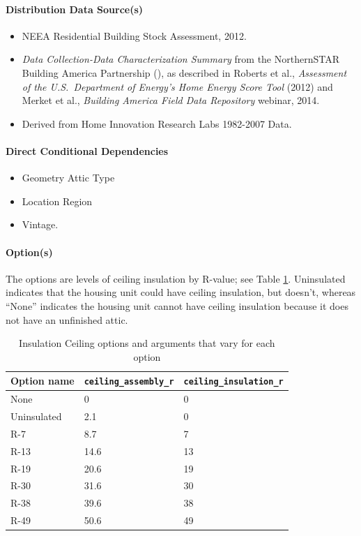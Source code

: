\paragraph{Distribution Data Source(s)}
\begin{itemize}
 
\item
  NEEA Residential Building Stock Assessment, 2012.
\item
  \textit{Data Collection-Data Characterization Summary} from the NorthernSTAR Building America Partnership (\cite{Nettleton2012}), as described in
  Roberts et al., \textit{Assessment of the U.S.~Department of
  Energy's Home Energy Score Tool} (2012)
  and Merket et al., \textit{Building America Field Data
  Repository} webinar, 2014.
\item
  Derived from Home Innovation Research Labs 1982-2007 Data.
\end{itemize}
\paragraph{Direct Conditional Dependencies}

\begin{itemize}
    \item Geometry Attic Type
    \item Location Region
    \item Vintage.
\end{itemize}
\paragraph{Option(s)}
The options are levels of ceiling insulation by R-value; see Table \ref{table:hc_opt_ins_ceil}. Uninsulated indicates that the housing unit could have ceiling insulation, but doesn't, whereas ``None'' indicates the housing unit cannot have ceiling insulation because it does not have an unfinished attic. 

\begin{longtable}[]{|p{3.5cm}|p{3.3cm}|p{3.3cm}|} \caption{Insulation Ceiling options and arguments that vary for each option} \label{table:hc_opt_ins_ceil} \\  
\toprule\noalign{}
Option name & \texttt{ceiling\_assembly\_r} &
\texttt{ceiling\_insulation\_r} \\
\midrule\noalign{}
\endhead
\bottomrule\noalign{}
\endlastfoot
None & 0 & 0 \\
Uninsulated & 2.1 & 0 \\
R-7 & 8.7 & 7 \\
R-13 & 14.6 & 13 \\
R-19 & 20.6 & 19 \\
R-30 & 31.6 & 30 \\
R-38 & 39.6 & 38 \\
R-49 & 50.6 & 49 \\
\end{longtable}
 
